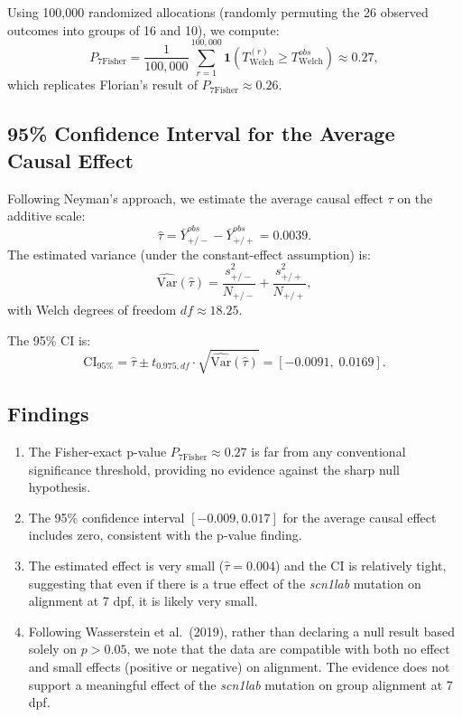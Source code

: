 \documentclass[11pt]{article}
\begin{document}
Using 100,000 randomized allocations (randomly permuting the 26 observed outcomes into groups of 16 and 10), we compute:
\[
  P_{7\text{Fisher}} = \frac{1}{100{,}000} \sum_{r=1}^{100{,}000} \mathbf{1}(T_{\text{Welch}}^{(r)} \geq T_{\text{Welch}}^{obs}) \approx 0.27,
\]
which replicates Florian's result of $P_{7\text{Fisher}} \approx 0.26$.

\subsection*{95\% Confidence Interval for the Average Causal Effect}

Following Neyman's approach, we estimate the average causal effect $\tau$ on the additive scale:
\[
  \hat{\tau} = \bar{Y}_{+/-}^{obs} - \bar{Y}_{+/+}^{obs} = 0.0039.
\]
The estimated variance (under the constant-effect assumption) is:
\[
  \widehat{\text{Var}}(\hat{\tau}) = \frac{s_{+/-}^2}{N_{+/-}} + \frac{s_{+/+}^2}{N_{+/+}},
\]
with Welch degrees of freedom $df \approx 18.25$.

The 95\% CI is:
\[
  \text{CI}_{95\%} = \hat{\tau} \pm t_{0.975, df} \cdot \sqrt{\widehat{\text{Var}}(\hat{\tau})} = [- 0.0091,\; 0.0169].
\]

\subsection*{Findings}

\begin{enumerate}
  \item The Fisher-exact p-value $P_{7\text{Fisher}} \approx 0.27$ is far from any conventional significance threshold, providing no evidence against the sharp null hypothesis.
  \item The 95\% confidence interval $[-0.009, 0.017]$ for the average causal effect includes zero, consistent with the p-value finding.
  \item The estimated effect is very small ($\hat{\tau} = 0.004$) and the CI is relatively tight, suggesting that even if there is a true effect of the \textit{scn1lab} mutation on alignment at 7 dpf, it is likely very small.
  \item Following Wasserstein et al.\ (2019), rather than declaring a null result based solely on $p > 0.05$, we note that the data are compatible with both no effect and small effects (positive or negative) on alignment. The evidence does not support a meaningful effect of the \textit{scn1lab} mutation on group alignment at 7 dpf.
\end{enumerate}
\end{document}
